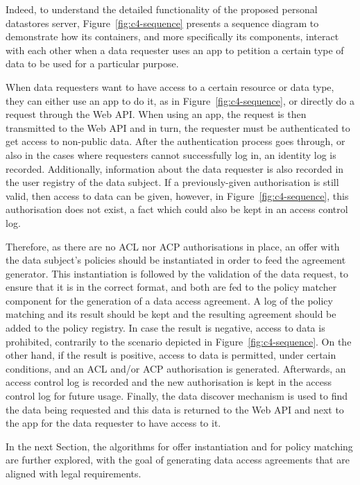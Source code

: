 Indeed, to understand the detailed functionality of the proposed personal datastores server, Figure~\ref{fig:c4-sequence} presents a sequence diagram to demonstrate how its containers, and more specifically its components, interact with each other when a data requester uses an app to petition a certain type of data to be used for a particular purpose.

When data requesters want to have access to a certain resource or data type, they can either use an app to do it, as in Figure~\ref{fig:c4-sequence}, or directly do a request through the Web API.
When using an app, the request is then transmitted to the Web API and in turn, the requester must be authenticated to get access to non-public data.
After the authentication process goes through, or also in the cases where requesters cannot successfully log in, an identity log is recorded.
Additionally, information about the data requester is also recorded in the user registry of the data subject.
If a previously-given authorisation is still valid, then access to data can be given, however, in Figure~\ref{fig:c4-sequence}, this authorisation does not exist, a fact which could also be kept in an access control log.

Therefore, as there are no ACL nor ACP authorisations in place, an offer with the data subject's policies should be instantiated in order to feed the agreement generator.
This instantiation is followed by the validation of the data request, to ensure that it is in the correct format, and both are fed to the policy matcher component for the generation of a data access agreement.
A log of the policy matching and its result should be kept and the resulting agreement should be added to the policy registry.
In case the result is negative, access to data is prohibited, contrarily to the scenario depicted in Figure~\ref{fig:c4-sequence}.
On the other hand, if the result is positive, access to data is permitted, under certain conditions, and an ACL and/or ACP authorisation is generated.
Afterwards, an access control log is recorded and the new authorisation is kept in the access control log for future usage.
Finally, the data discover mechanism is used to find the data being requested and this data is returned to the Web API and next to the app for the data requester to have access to it.

In the next Section, the algorithms for offer instantiation and for policy matching are further explored, with the goal of generating data access agreements that are aligned with legal requirements.

